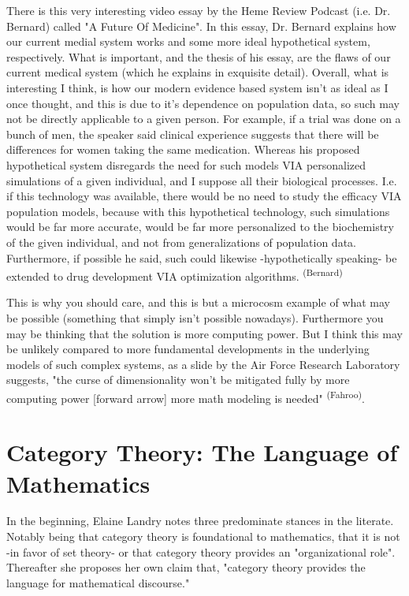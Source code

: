 There is this very interesting video essay by the Heme Review Podcast (i.e.  Dr. Bernard) called "A Future Of Medicine". In this essay, Dr. Bernard explains how our current medial system works and some more ideal hypothetical system, respectively. What is important, and the thesis of his essay, are the flaws of our current medical system (which he explains in exquisite detail). Overall, what is interesting I think, is how our modern evidence based system isn’t as ideal as I once thought, and this is due to it’s dependence on population data, so such may not be directly applicable to a given person. For example, if a trial was done on a bunch of men, the speaker said clinical experience suggests that there will be differences for women taking the same medication. Whereas his proposed hypothetical system disregards the need for such models VIA personalized simulations of a given individual, and I suppose all their biological processes. I.e. if this technology was available, there would be no need to study the efficacy VIA population models, because with this hypothetical technology, such simulations would be far more accurate, would be far more personalized to the biochemistry of the given individual, and not from generalizations of population data. Furthermore, if possible he said, such could likewise -hypothetically speaking- be extended to drug development VIA optimization algorithms. \textsuperscript{(Bernard)}

This is why you should care, and this is but a microcosm example of what may be possible (something that simply isn't possible nowadays). Furthermore you may be thinking that the solution is more computing power. But I think this may be unlikely compared to more fundamental developments in the underlying models of such complex systems, as a slide by the Air Force Research Laboratory suggests, "the curse of dimensionality won’t be mitigated fully by more computing power [forward arrow] more math modeling is needed" \textsuperscript{(Fahroo)}.


\section*{Category Theory: The Language of Mathematics}

In the beginning, Elaine Landry notes three predominate stances in the literate. Notably being that category theory is foundational to mathematics, that it is not -in favor of set theory- or that category theory provides an "organizational role".  Thereafter she proposes her own claim that, "category theory provides the language for mathematical discourse."


